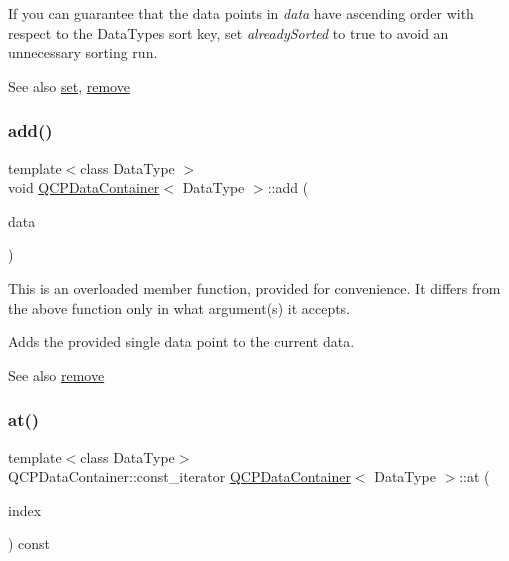 If you can guarantee that the data points in {\itshape data} have ascending order with respect to the Data\+Type\textquotesingle{}s sort key, set {\itshape already\+Sorted} to true to avoid an unnecessary sorting run.

\begin{DoxySeeAlso}{See also}
\hyperlink{class_q_c_p_data_container_ae7042bd534fc3ce7befa2ce3f790b5bf}{set}, \hyperlink{class_q_c_p_data_container_ae5f569a120648b167efa78835f12fd38}{remove} 
\end{DoxySeeAlso}
\mbox{\label{class_q_c_p_data_container_a715e8e9972466804954a2f8fbd5288b7}} 
\subsubsection{\texorpdfstring{add()}{add()}\hspace{0.1cm}{\footnotesize\ttfamily [3/3]}}
{\footnotesize\ttfamily template$<$class Data\+Type $>$ \\
void \hyperlink{class_q_c_p_data_container}{Q\+C\+P\+Data\+Container}$<$ Data\+Type $>$\+::add (\begin{DoxyParamCaption}\item[{const Data\+Type \&}]{data }\end{DoxyParamCaption})}

This is an overloaded member function, provided for convenience. It differs from the above function only in what argument(s) it accepts.

Adds the provided single data point to the current data.

\begin{DoxySeeAlso}{See also}
\hyperlink{class_q_c_p_data_container_ae5f569a120648b167efa78835f12fd38}{remove} 
\end{DoxySeeAlso}
\mbox{\label{class_q_c_p_data_container_ae90c7457a052b223539906e6bddc0a92}} 
\subsubsection{\texorpdfstring{at()}{at()}}
{\footnotesize\ttfamily template$<$class Data\+Type$>$ \\
Q\+C\+P\+Data\+Container\+::const\+\_\+iterator \hyperlink{class_q_c_p_data_container}{Q\+C\+P\+Data\+Container}$<$ Data\+Type $>$\+::at (\begin{DoxyParamCaption}\item[{int}]{index }\end{DoxyParamCaption}) const\hspace{0.3cm}{\ttfamily [inline]}}

